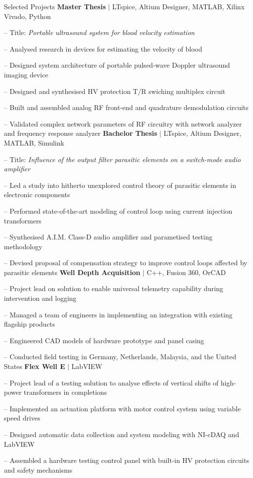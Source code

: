 
\begin{rubric}{\faTasks[solid]  Selected Projects}
\entry*[2023][]%
	\textbf{Master Thesis} $|$ LTspice, Altium Designer, MATLAB, Xilinx Vivado, Python \par
	-- Title: \emph{Portable ultrasound system for blood velocity estimation} \par
	-- Analysed research in devices for estimating the velocity of blood \par
	-- Designed system architecture of portable pulsed-wave Doppler ultrasound imaging device \par
	-- Designed and synthesised HV protection T/R swiching multiplex circuit \par
	-- Built and assembled analog RF front-end and quadrature demodulation circuits \par
	-- Validated complex network parameters of RF circuitry with network analyzer and frequency response analyzer
%
\entry*[2020][] \textbf{Bachelor Thesis} $|$ LTspice, Altium Designer, MATLAB, Simulink \par
	-- Title: \emph{Influence of the output filter parasitic elements on a switch-mode audio amplifier} \par
	-- Led a study into hitherto unexplored control theory of parasitic elements in electronic components \par
	-- Performed state-of-the-art modeling of control loop using current injection transformers \par
	-- Synthesised A.I.M. Class-D audio amplifier and parametised testing methodology\par
	-- Devised proposal of compensation strategy to improve control loops affected by parasitic elements
%
\entry*[2017][] \textbf{Well Depth Acquisition} $|$ C++, Fusion 360, OrCAD \par
	-- Project lead on solution to enable universal telemetry capability during intervention and logging \par
	-- Managed a team of engineers in implementing an integration with existing flagship products \par
	-- Engineered CAD models of hardware prototype and panel casing \par
	-- Conducted field testing in Germany, Netherlands, Malaysia, and the United States
%
\entry*[2016][] \textbf{Flex Well E} $|$ LabVIEW \par
	-- Project lead of a testing solution to analyse effects of vertical shifts of high-power transformers in completions \par
	-- Implemented an actuation platform with motor control system using variable speed drives \par
	-- Designed automatic data collection and system modeling with NI-cDAQ and LabVIEW \par
	-- Assembled a hardware testing control panel with built-in HV protection circuits and safety mechanisms
\end{rubric}